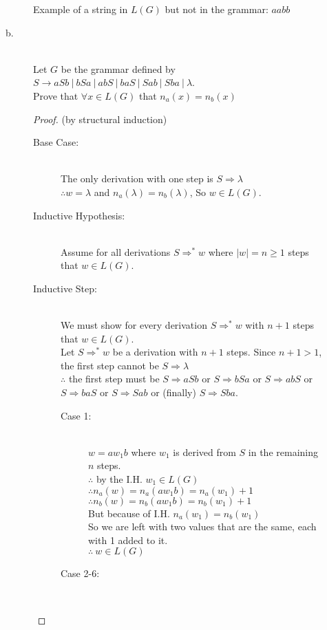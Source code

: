\documentclass{article}
\begin{document}
\begin{description}
\begin{description}
    Example of a string in $L(G)$ but not in the grammar: $aabb$
  \item[b.]\hfill \\
    Let $G$ be the grammar defined by $S \rightarrow aSb ~|~ bSa ~|~ abS ~|~ baS ~|~ Sab ~|~ Sba ~|~ \lambda$.\\
    Prove that $\forall x \in L(G)$ that $n_a(x) = n_b(x)$
    
    \begin{proof}
      (by structural induction)
      \begin{description}
      \item[Base Case:]\hfill \\
        The only derivation with one step is $S \Rightarrow \lambda$\\
        $\therefore w = \lambda$ and $n_a(\lambda) = n_b(\lambda)$, So $w \in L(G)$.
      \item[Inductive Hypothesis:]\hfill \\
        Assume for all derivations $S \Rightarrow^* w$ where $|w| = n \ge 1$ steps that $w \in L(G)$.
      \item[Inductive Step:]\hfill \\
        We must show for every derivation $S \Rightarrow^* w$ with $n+1$ steps that $w \in L(G)$.\\
        Let $S\Rightarrow^* w$ be a derivation with $n+1$ steps. Since $n+1 > 1$, the first step cannot be $S \Rightarrow \lambda$\\
        $\therefore$ the first step must be $S\Rightarrow aSb$ or  $S\Rightarrow bSa$ or $S\Rightarrow abS$ or  $S\Rightarrow baS$ or  $S\Rightarrow Sab$ or (finally)  $S\Rightarrow Sba$.
        \begin{description}
        \item[Case 1:]\hfill \\
          $w=aw_1 b$ where $w_1$ is derived from $S$ in the remaining $n$ steps.\\
          $\therefore$ by the I.H. $w_1 \in L(G)$\\
          $\therefore n_a(w) = n_a(aw_1 b) = n_a(w_1) + 1$\\
          $\therefore n_b(w) = n_b(aw_1 b) = n_b(w_1) + 1$\\
          But because of I.H. $n_a(w_1) = n_b(w_1)$\\
          So we are left with two values that are the same, each with 1 added to it.\\
          $\therefore~ w \in L(G)$ 
        \item[Case 2-6:]\hfill \\

\end{description}
\end{description}
\end{proof}
\end{description}
\end{description}
\end{document}
